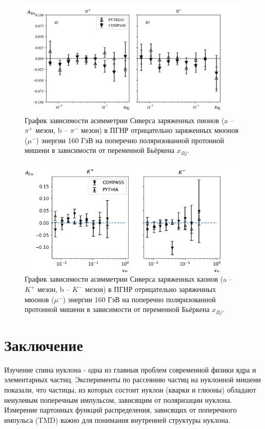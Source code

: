 \documentclass{extreport}
\begin{document}
\begin{figure}[h!]
	\centering
	\includegraphics[width=\linewidth]{pion.jpg}
	\caption{График зависимости асимметрии Сиверса заряженных пионов (a -- $\pi^+$ мезон, b -- $\pi^-$ мезон) в ПГНР отрицательно заряженных мюонов ($\mu^-$) энергии 160 ГэВ на поперечно поляризованной протонной мишени в зависимости от переменной Бьёркена $x_{Bj}$. }
	\label{fig:pions}
\end{figure}

\begin{figure}[h!]
	\centering
	\includegraphics[width=\linewidth]{ASivK.png}
	\caption{График зависимости асимметрии Сиверса заряженных каонов (a -- $K^+$ мезон, b -- $K^-$ мезон) в ПГНР отрицательно заряженных мюонов ($\mu^-$) энергии 160 ГэВ на поперечно поляризованной протонной мишени в зависимости от переменной Бьёркена $x_{Bj}$. }
	\label{fig:ASivK.png}
\end{figure}

\newpage
\chapter*{Заключение}
\thispagestyle{headings}
Изучение спина нуклона - одна из главныв проблем современной физики ядра и элементарных частиц. Эксперименты по рассеянию частиц на нуклонной мишени показали, что частицы, из которых состоит нуклон (кварки и глюоны) обладают ненулевым поперечным импульсом, зависящим от поляризации нуклона. Измерение партонных функций распределения, зависящих от поперечного импульса (TMD) важно для понимания внутренней структуры нуклона.
\end{document}
